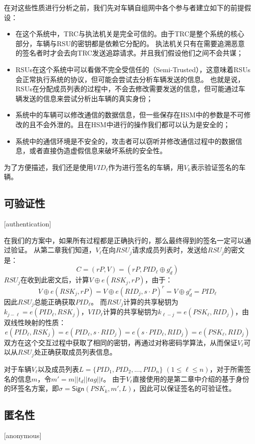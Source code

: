 在对这些性质进行分析之前，我们先对车辆自组网中各个参与者建立如下的前提假设：

\begin{itemize}
  \item 在这个系统中，TRC与执法机关是完全可信的。由于TRC是整个系统的核心部分，车辆与RSU的密钥都是依赖它分配的。
  执法机关只有在需要追溯恶意的签名者时才会去向TRC发送追踪请求。并且我们假设他们之间不会共谋；
  \item RSUs在这个系统中可以看做不完全受信任的（Semi-Trusted），这意味着RSUs会正常执行系统的协议，但可能会尝试去分析车辆发送的信息。
  也就是说，RSUs在分配成员列表的过程中，不会去修改需要发送的信息，但可能通过车辆发送的信息来尝试分析出车辆的真实身份；
  \item 系统中的车辆可以修改通信的数据信息，但一些保存在HSM中的参数是不可修改的且不会外泄的。且在HSM中进行的操作我们都可以认为是安全的；
  \item 系统中的通信环境是不安全的，攻击者可以窃听并修改通信过程中的数据信息，或者直接伪造虚假信息来破坏系统的安全性。
\end{itemize}

为了方便描述，我们还是使用$VID_\ell$作为进行签名的车辆，用$V_k$表示验证签名的车辆。


\subsection{可验证性}[authentication]

在我们的方案中，如果所有过程都是正确执行的，那么最终得到的签名一定可以通过验证。
从第二章我们知道，$V_\ell$在向$RSU_j$请求成员列表时，发送给$RSU_j$的密文是：
$$C=(rP,V)=(rP,PID_\ell\oplus g_d^r)$$
$RSU_j$在收到此密文后，计算$V\oplus e(RSK_j,rP)$，由于：
$$V\oplus e(RSK_j,rP)=V\oplus e(RID_j,s\cdot P)^r=V\oplus g_d^r=PID_\ell$$
因此$RSU_j$总能正确获取$PID_\ell$。
而$RSU_j$计算的共享秘钥为$k_{j-\ell}=e(PID_\ell,RSK_j)$，$VID_\ell$计算的共享秘钥为$k_{\ell-j}=e(PSK_\ell,RID_j)$，由双线性映射的性质：
$$e(PID_\ell,RSK_j)=e(PID_\ell,s\cdot RID_j)=e(s\cdot PID_\ell,RID_j)=e(PSK_\ell,RID_j)$$
双方在这个交互过程中获取了相同的密钥，再通过对称密码学算法，从而保证$V_\ell$可以从$RSU_j$处正确获取成员列表信息。

对于车辆$V_\ell$以及成员列表$L=\{PID_1,PID_2,...,PID_n\}$ $(1\leq \ell\leq n)$，对于所需签名的信息$m$，令$m'=m||t_d||tag||t$。
由于$V_\ell$直接使用的是第二章中介绍的基于身份的环签名方案\cite{chow2005efficient}，即$\sigma=\mathsf{Sign}(PSK_k,m',L)$，因此可以保证签名的可验证性。

\subsection{匿名性}[anonymous]

